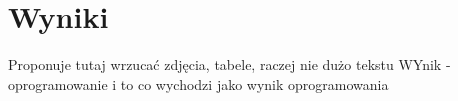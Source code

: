 \section{Wyniki}

Proponuje tutaj wrzucać zdjęcia, tabele, raczej nie dużo tekstu
WYnik - oprogramowanie i to co wychodzi jako wynik oprogramowania 









